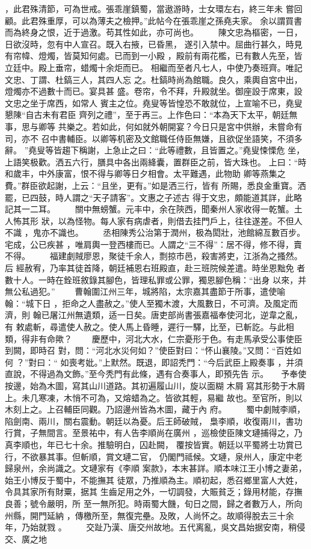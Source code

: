 \documentclass{ctexart}
\begin{document}
，此君殊清節，可為世戒。張乖崖鎮蜀，當遨游時，士女環左右，終三年未 嘗回顧。此君殊重厚，可以為薄夫之檢押。''此帖今在張乖崖之孫堯夫家。 余以謂買書而為終身之恨，近于過激。苟其性如此，亦可尚也。 　　陳文忠為樞密，一日，日欲沒時，忽有中人宣召。既入右掖，已昏黑， 遂引入禁中。屈曲行甚久，時見有帘幃、燈燭，皆莫知何處。已而到一小殿 ，殿前有兩花檻，已有數人先至，皆立廷中。殿上垂帘，蜡燭十余炬而已。 相繼而至者凡七人，中使乃奏班齊。唯記文忠、丁謂、杜鎬三人，其四人忘 之。杜鎬時尚為館職。良久，乘輿自宮中出，燈燭亦不過數十而已。宴具甚 盛。卷帘，令不拜，升殿就坐。御座設于席東，設文忠之坐于席西，如常人 賓主之位。堯叟等皆惶恐不敢就位，上宣喻不已，堯叟懇陳``自古未有君臣 齊列之禮''，至于再三。上作色曰：``本為天下太平，朝廷無事，思与卿等 共樂之。若如此，何如就外朝開宴？今日只是宮中供辦，未嘗命有司，亦不 召中書輔臣。以卿等机密及文館職任侍臣無嫌，且欲促坐語笑，不須多辭。 ''堯叟等皆趨下稱謝，上急止之曰：``此等禮數，且皆置之。''堯叟悚慄危 坐，上語笑极歡。洒五六行，膳具中各出兩絳囊，置群臣之前，皆大珠也。 上曰：``時和歲丰，中外康富，恨不得与卿等日夕相會。太平難遇，此物助 卿等燕集之費。''群臣欲起謝，上云：``且坐，更有。''如是洒三行，皆有 所賜，悉良金重寶。洒罷，已四鼓，時人謂之``天子請客''。文惠之子述古 得于文忠，頗能道其詳，此略記其一二耳。 　　關中無螃蟹。元丰中，余在陝西，聞秦州人家收得一乾蟹。土人怖其形 狀，以為怪物。每人家有病虐者，則借去挂門戶上，往往遂差。不但人不識 ，鬼亦不識也。 　　丞相陳秀公治第于潤州，极為閎壯，池館綿亙數百步。宅成，公已疾甚 ，唯肩輿一登西樓而已。人謂之``三不得''：居不得，修不得，賣不得。 　　福建劇賊廖恩，聚徒千余人，剽掠市邑，殺害將吏，江浙為之搔然。后 經赦宥，乃率其徒首降，朝廷補恩右班殿直，赴三班院候差遣。時坐恩黜免 者數十人。一時在銓班敘錄其腳色，皆理私罪或公罪，獨恩腳色稱：``出身 以來，并無公私過犯。'' 　　曹翰圍江州三年，城將陷，太宗嘉其盡節于所事，遣使喻翰：``城下日 ，拒命之人盡赦之。''使人至獨木渡，大風數日，不可濟。及風定而濟，則 翰已屠江州無遺類，适一日矣。唐吏部尚書張嘉福奉使河北，逆韋之亂，有 敕處斬，尋遣使人赦之。使人馬上昏睡，遲行一驛，比至，已斬訖。与此相 類，得非有命歟？ 　　慶歷中，河北大水，仁宗憂形于色。有走馬承受公事使臣到闕，即時召 對，問：``河北水災何如？''使臣對曰：``怀山襄陵。''又問：``百姓如何 ？''對曰：`` 如喪考妣。''上默然。既退，即詔秃門：``今后武臣上殿奏事 ，并須直說，不得過為文飾。''至今秃門有此條，遇有合奏事人，即預先告 示。　　予奉使按邊，始為木圖，寫其山川道路。其初遍履山川，旋以面糊 木屑 寫其形勢于木屑上。未几寒凍，木悄不可為，又熔蜡為之。皆欲其輕，易繼 故也。至官所，則以木刻上之。上召輔臣同觀。乃詔邊州皆為木圖，藏于內 府。 　　蜀中劇賊李順，陷劍南、兩川，關右震動。朝廷以為憂。后王師破賊， 梟李順，收復兩川，書功行賞，子無間言。至景祐中，有人告李順尚在廣州 ，巡檢使臣陳文璉捕得之，乃真李順也，年已七十余。推驗明白，囚赴闕， 覆按皆實。朝廷以平蜀將士功賞已行，不欲暴其事。但斬順，賞文璉二官， 仍閣門祗候。文璉，泉州人，康定中老歸泉州，余尚識之。文璉家有《李順 案款》，本末甚詳。順本味江王小博之妻弟，始王小博反于蜀中，不能撫其 徒眾，乃推順為主。順初起，悉召鄉里富人大姓，令具其家所有財粟，据其 生齒足用之外，一切調發，大賑貧乏；錄用材能，存撫良善；號令嚴明，所 至一無所犯。時兩蜀大饑，旬日之間，歸之者數万人，所向州縣，開門延納 ，傳檄所至，無復完壘。及敗，人尚怀之。故順得脫去三十余年，乃始就戮 。 　　交趾乃漢、唐交州故地。五代离亂，吳文昌始据安南，稍侵交、廣之地 
\end{document}
